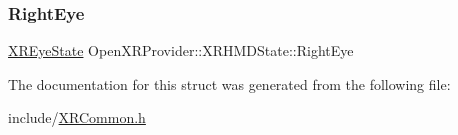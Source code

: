 \subsubsection{\texorpdfstring{RightEye}{RightEye}}
{\footnotesize\ttfamily \mbox{\hyperlink{struct_open_x_r_provider_1_1_x_r_eye_state}{X\+R\+Eye\+State}} Open\+X\+R\+Provider\+::\+X\+R\+H\+M\+D\+State\+::\+Right\+Eye}



The documentation for this struct was generated from the following file\+:\begin{DoxyCompactItemize}
\item 
include/\mbox{\hyperlink{_x_r_common_8h}{X\+R\+Common.\+h}}\end{DoxyCompactItemize}
